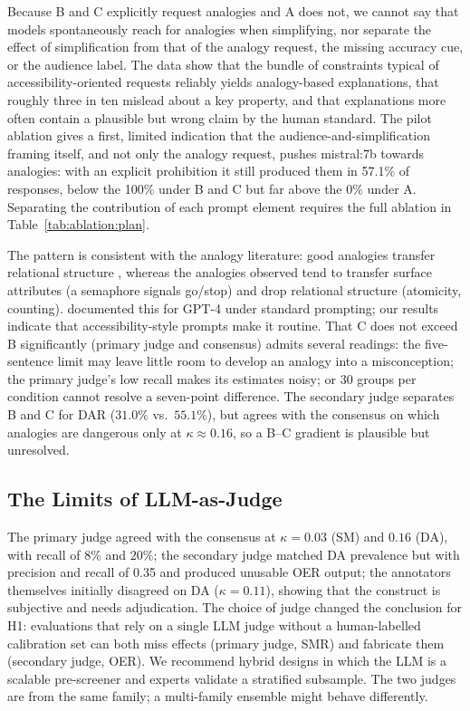 \documentclass[journal,article,submit,pdftex,moreauthors]{Definitions/mdpi}
\begin{document}
Because B and C explicitly request analogies and A does not, we cannot say that models spontaneously reach for analogies when simplifying, nor separate the effect of simplification from that of the analogy request, the missing accuracy cue, or the audience label. The data show that the bundle of constraints typical of accessibility-oriented requests reliably yields analogy-based explanations, that roughly three in ten mislead about a key property, and that explanations more often contain a plausible but wrong claim by the human standard. The pilot ablation gives a first, limited indication that the audience-and-simplification framing itself, and not only the analogy request, pushes mistral:7b towards analogies: with an explicit prohibition it still produced them in 57.1\% of responses, below the 100\% under B and C but far above the 0\% under A. Separating the contribution of each prompt element requires the full ablation in Table~\ref{tab:ablation:plan}.

The pattern is consistent with the analogy literature: good analogies transfer relational structure \cite{gentner1983structure}, whereas the analogies observed tend to transfer surface attributes (a semaphore signals go/stop) and drop relational structure (atomicity, counting). \citet{stone2024analogies} documented this for GPT-4 under standard prompting; our results indicate that accessibility-style prompts make it routine. That C does not exceed B significantly (primary judge and consensus) admits several readings: the five-sentence limit may leave little room to develop an analogy into a misconception; the primary judge's low recall makes its estimates noisy; or 30 groups per condition cannot resolve a seven-point difference. The secondary judge separates B and C for DAR ($31.0\%$ vs.\ $55.1\%$), but agrees with the consensus on which analogies are dangerous only at $\kappa \approx 0.16$, so a B--C gradient is plausible but unresolved.

\subsection{The Limits of LLM-as-Judge}

The primary judge agreed with the consensus at $\kappa = 0.03$ (SM) and $0.16$ (DA), with recall of $8\%$ and $20\%$; the secondary judge matched DA prevalence but with precision and recall of 0.35 and produced unusable OER output; the annotators themselves initially disagreed on DA ($\kappa = 0.11$), showing that the construct is subjective and needs adjudication. The choice of judge changed the conclusion for H1: evaluations that rely on a single LLM judge without a human-labelled calibration set can both miss effects (primary judge, SMR) and fabricate them (secondary judge, OER). We recommend hybrid designs in which the LLM is a scalable pre-screener and experts validate a stratified subsample. The two judges are from the same family; a multi-family ensemble might behave differently.
\end{document}
